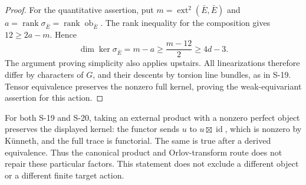 \documentclass[11pt,a4paper]{article}
\theoremstyle{definition}
\begin{document}
\begin{proof}
For the quantitative assertion, put
$m=\operatorname{ext}^2(\bar E,\bar E)$ and
$a=\operatorname{rank}\sigma_{\bar E}
=\operatorname{rank}\operatorname{ob}_{\bar E}$.
The rank inequality for the composition gives
$12\ge2a-m$. Hence
\[
 \dim\ker\sigma_{\bar E}=m-a
 \ge\frac{m-12}{2}\ge4d-3.
\]
The argument proving simplicity also applies upstairs.
All linearizations therefore differ by characters of $G$,
and their descents by torsion line bundles, as in S-19.
Tensor equivalence preserves the nonzero full kernel,
proving the weak-equivariant assertion for this action.
\end{proof}

For both S-19 and S-20, taking an external product with a
nonzero perfect object preserves the displayed kernel:
the functor sends $u$ to $u\boxtimes\operatorname{id}$,
which is nonzero by K\"unneth, and the full trace is functorial.
The same is true after a derived equivalence.
Thus the canonical product and Orlov-transform route does not
repair these particular factors. This statement does not
exclude a different object or a different finite target action.
\end{document}
